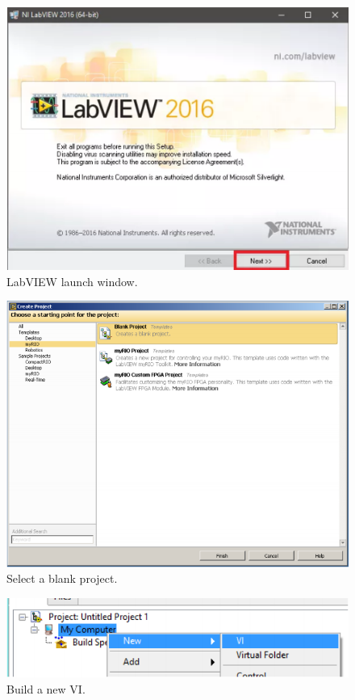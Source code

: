 \documentclass{article}
\begin{document}
\begin{figure}[h!]
\hspace{15mm} 
\includegraphics[scale=0.8]{figs/intro.png}
\caption{LabVIEW launch window.}
\label{fig:intro}
\end{figure}

\begin{figure}[h!]
\hspace{18mm} 
\includegraphics[scale=0.6]{figs/create_project.png}
\caption{Select a blank project.}
\label{fig:create_project}
\end{figure}

\begin{figure}[h!]
\hspace{15mm} 
\includegraphics[scale=0.6]{figs/new_vi.png}
\caption{Build a new VI.}
\label{fig:new_vi}
\end{figure}
\end{document}
